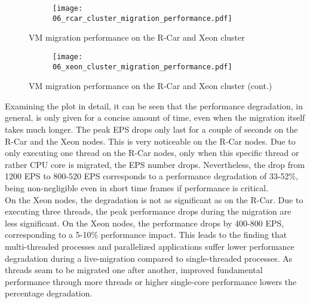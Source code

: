             \begin{figure}[H]
                \centering
                \begin{subfigure}[b]{\textwidth}
                    \centering
                    \texttt{[image: 06\_rcar\_cluster\_migration\_performance.pdf]}
               \end{subfigure}
               \caption[]{VM migration performance on the R-Car and Xeon cluster}
            \end{figure}%
            \begin{figure}[ht]\ContinuedFloat
                \centering
                \begin{subfigure}[b]{\textwidth}
                    \centering
                    \texttt{[image: 06\_xeon\_cluster\_migration\_performance.pdf]}
                \end{subfigure}
                \caption[VM migration performance on the R-Car and Xeon cluster]{VM migration performance on the R-Car and Xeon cluster (cont.)}
                \label{figure:vm_migration_performance}
            \end{figure}

            \noindent Examining the plot in detail, it can be seen that the performance degradation, in general, is only given for a concise amount of time, even when the migration itself takes much longer.
            The peak EPS drops only last for a couple of seconds on the R-Car and the Xeon nodes.
            This is very noticeable on the R-Car nodes.
            Due to only executing one thread on the R-Car nodes, only when this specific thread or rather \ac{CPU} core is migrated, the \ac{EPS} number drops.
            Nevertheless, the drop from 1200 \ac{EPS} to 800-520 \ac{EPS} corresponds to a performance degradation of 33-52\%, being non-negligible even in short time frames if performance is critical.\\
            On the Xeon nodes, the degradation is not as significant as on the R-Car.
            Due to executing three threads, the peak performance drops during the migration are less significant.
            On the Xeon nodes, the performance drops by 400-800 \ac{EPS}, corresponding to a 5-10\% performance impact.
            This leads to the finding that multi-threaded processes and parallelized applications suffer lower performance degradation during a live-migration compared to single-threaded processes.
            As threads seam to be migrated one after another, improved fundamental performance through more threads or higher single-core performance lowers the percentage degradation.
            

